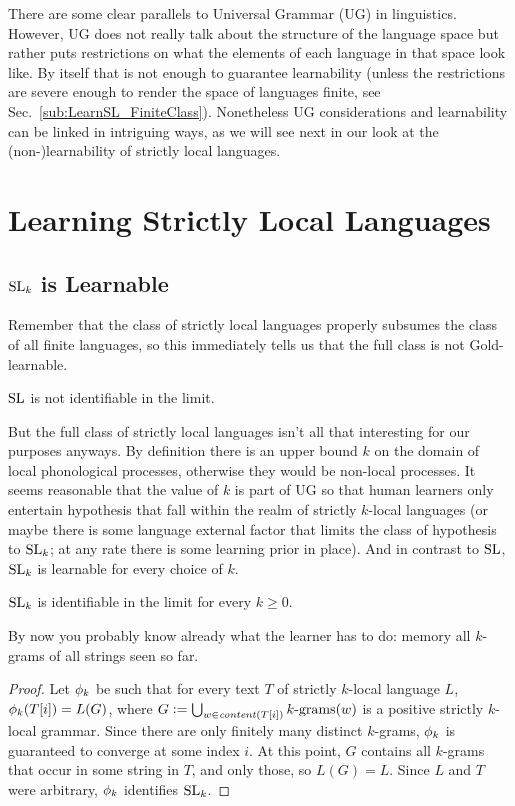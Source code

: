 There are some clear parallels to Universal Grammar (UG) in linguistics.
However, UG does not really talk about the structure of the language space but rather puts restrictions on what the elements of each language in that space look like.
By itself that is not enough to guarantee learnability (unless the restrictions are severe enough to render the space of languages finite, see Sec.~\ref{sub:LearnSL_FiniteClass}).
Nonetheless UG considerations and learnability can be linked in intriguing ways, as we will see next in our look at the (non-)learnability of strictly local languages.

\section{Learning Strictly Local Languages}

\subsection{\texorpdfstring{$\SL_k$ is Learnable}{SLk is Learnable}}
%
Remember that the class of strictly local languages properly subsumes the class of all finite languages, so this immediately tells us that the full class is not Gold-learnable.
%
\begin{corollary}
    $\SL$ is not identifiable in the limit.
\end{corollary}

But the full class of strictly local languages isn't all that interesting for our purposes anyways.
By definition there is an upper bound $k$ on the domain of local phonological processes, otherwise they would be non-local processes.
It seems reasonable that the value of $k$ is part of UG so that human learners only entertain hypothesis that fall within the realm of strictly $k$-local languages (or maybe there is some language external factor that limits the class of hypothesis to $\SL_k$; at any rate there is some learning prior in place).
And in contrast to $\SL$, $\SL_k$ is learnable for every choice of $k$.
%
\begin{theorem}
    $\SL_k$ is identifiable in the limit for every $k \geq 0$.
\end{theorem}
%
By now you probably know already what the learner has to do: memory all $k$-grams of all strings seen so far.
%
\begin{proof}
    Let $\Learner_k$ be such that for every text $T$ of strictly $k$-local language $L$, $\Learner_k(T[i]) = L(G)$, where $G \is \bigcup_{w \in \contentof(T[i])} \Bigrams[k](w)$ is a positive strictly $k$-local grammar.
    Since there are only finitely many distinct $k$-grams, $\Learner_k$ is guaranteed to converge at some index $i$.
    At this point, $G$ contains all $k$-grams that occur in some string in $T$, and only those, so $L(G) = L$.
    Since $L$ and $T$ were arbitrary, $\Learner_k$ identifies $\SL_k$.
\end{proof}

